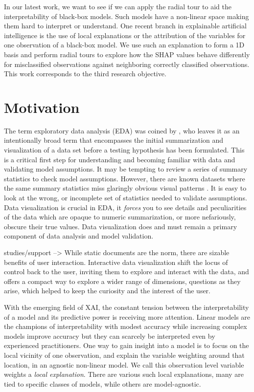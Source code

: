 \documentclass{template/monashthesis}
\begin{document}
In our latest work, we want to see if we can apply the radial tour to aid the interpretability of black-box models. Such models have a non-linear space making them hard to interpret or understand. One recent branch in explainable artificial intelligence \autocite[XAI,][\textcite{arrieta_explainable_2020}]{adadi_peeking_2018} is the use of local explanations or the attribution of the variables for one observation of a black-box model. We use such an explanation to form a 1D basis and perform radial tours to explore how the SHAP values behave differently for misclassified observations against neighboring correctly classified observations. This work corresponds to the third research objective.

\hypertarget{motivation}{%
\section{Motivation}\label{motivation}}

The term exploratory data analysis (EDA) was coined by \textcite{tukey_exploratory_1977}, who leaves it as an intentionally broad term that encompasses the initial summarization and visualization of a data set before a testing hypothesis has been formulated. This is a critical first step for understanding and becoming familiar with data and validating model assumptions. It may be tempting to review a series of summary statistics to check model assumptions. However, there are known datasets where the same summary statistics miss glaringly obvious visual patterns \autocite{anscombe_graphs_1973,matejka_same_2017}. It is easy to look at the wrong, or incomplete set of statistics needed to validate assumptions. Data visualization is crucial in EDA, it \emph{forces} you to see details and peculiarities of the data which are opaque to numeric summarization, or more nefariously, obscure their true values. Data visualization does and must remain a primary component of data analysis and model validation.

studies/support --\textgreater{}
While static documents are the norm, there are sizable benefits of user interaction. Interactive data visualization shift the locus of control back to the user, inviting them to explore and interact with the data, and offers a compact way to explore a wider range of dimensions, questions as they arise, which helped to keep the curiosity and the interest of the user.

With the emerging field of XAI, the constant tension between the interpretability of a model and its predictive power is receiving more attention. Linear models are the champions of interpretability with modest accuracy while increasing complex models improve accuracy but they can scarcely be interpreted even by experienced practitioners. One way to gain insight into a model is to focus on the local vicinity of one observation, and explain the variable weighting around that location, in an agnostic non-linear model. We call this observation level variable weights a \emph{local explanation}. There are various such local explanations, many are tied to specific classes of models, while others are model-agnostic.
\end{document}
